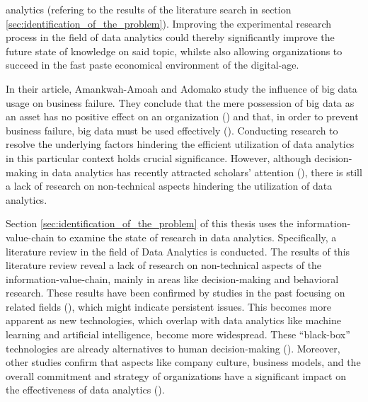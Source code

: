 analytics (refering to the results of the literature search in section \ref{sec:identification_of_the_problem}). Improving the experimental research process in the field of data analytics could thereby significantly improve the future state of knowledge on said topic, whilste also allowing organizations to succeed in the fast paste economical environment of the digital-age.

In their article, Amankwah-Amoah and Adomako study the influence of big data usage on business failure. They conclude that the mere possession of big data as an asset has no positive effect on an organization (\cite{AmankwahAmoah.2019}) and that, in order to prevent business failure, big data must be used effectively (\cite{AmankwahAmoah.2019}). Conducting research to resolve the underlying factors hindering the efficient utilization of data analytics in this particular context holds crucial significance. However, although decision-making in data analytics has recently attracted scholars' attention (\cite{Chen.2022}), there is still a lack of research on non-technical aspects hindering the utilization of data analytics.

Section \ref{sec:identification_of_the_problem} of this thesis uses the information-value-chain to examine the state of research in data analytics. Specifically, a literature review in the field of Data Analytics is conducted. The results of this literature review reveal a lack of research on non-technical aspects of the information-value-chain, mainly in areas like decision-making and behavioral research. These results have been confirmed by studies in the past focusing on related fields (\cite{Trieu.2017}), which might indicate persistent issues. This becomes more apparent as new technologies, which overlap with data analytics like machine learning and artificial intelligence, become more widespread. These \enquote{black-box} technologies are already alternatives to human decision-making (\cite{Krakowski.2023}). Moreover, other studies confirm that aspects like company culture, business models, and the overall commitment and strategy of organizations have a significant impact on the effectiveness of data analytics (\cite{Holsapple.2014}).

